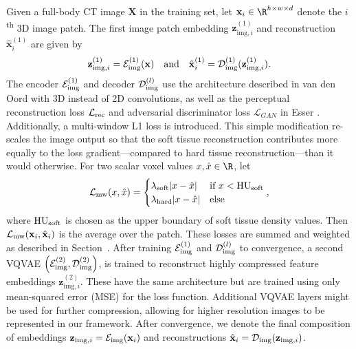 Given a full-body CT image $\mathbf{X}$ in the training set, let $\mathbf{x}_i \in \R^{h \times w \times d}$ denote the $i$\textsuperscript{th} 3D image patch.
The first image patch embedding $\mathbf{z}_{\mathrm{img},i}^{(1)}$ and reconstruction $\hat{\mathbf{x}}_i^{(1)}$ are given by
\begin{align}
  \label{eq:2}
  \mathbf{z}_{\mathrm{img},i}^{(1)} = \mathcal{E}_{\rm img}^{(1)}(\mathbf{x})
  \text{~~~and~~~} \hat{\mathbf{x}}_i^{(1)} = \mathcal{D}_{\rm img}^{(1)}(\mathbf{z}_{\mathrm{img},i}^{(1)}).
\end{align}
The encoder $\mathcal{E}_{\rm img}^{(1)}$ and decoder $\mathcal{D}_{\rm img}^{(l)}$ use the architecture described in van den Oord \etal\cite{van2017neural} with 3D instead of 2D convolutions, as well as the perceptual reconstruction loss $\mathcal{L}_{\rm rec}$ and adversarial discriminator loss $\mathcal{L}_{GAN}$ in Esser \etal.\cite{esser2020taming}
Additionally, a multi-window L1 loss is introduced. This simple modification re-scales the image output so that the soft tissue reconstruction contributes more equally to the loss gradient---compared to hard tissue reconstruction---than it would otherwise. For two scalar voxel values $x, \hat{x} \in \R$, let
\begin{align}
  \label{eq:3}
  \mathcal{L}_{\rm mw}(x, \hat{x}) =
  \begin{cases}
    \lambda_{\rm soft} |x - \hat{x}| & \text{if } x < \text{HU}_{\rm soft}\\
    \lambda_{\rm hard} |x - \hat{x}| & \text{else}
  \end{cases},
\end{align} where $\text{HU}_{\rm soft}$ is chosen as the upper boundary of soft tissue density values. Then $\mathcal{L}_{\rm mw}(\mathbf{x}_i, \hat{\mathbf{x}}_i)$ is the average over the patch. These losses are summed and weighted as described in Section~.
After training $\mathcal{E}_{\rm img}^{(1)}$ and $\mathcal{D}_{\rm img}^{(l)}$ to convergence, a second VQVAE $\left(\mathcal{E}_{\rm img}^{(2)}, \mathcal{D}_{\rm img}^{(2)}\right)$, is trained to reconstruct highly compressed feature embeddings $\mathbf{z}_{\mathrm{img},i}^{(2)}$. These have the same architecture but are trained using only mean-squared error (MSE) for the loss function. Additional VQVAE layers might be used for further compression, allowing for higher resolution images to be represented in our framework. After convergence, we denote the final composition of embeddings $\mathbf{z}_{\mathrm{img},i} = \mathcal{E}_{\rm img}(\mathbf{x}_i)$ and reconstructions $\hat{\mathbf{x}}_{i} = \mathcal{D}_{\rm img}(\mathbf{z}_{\mathrm{img},i})$.

